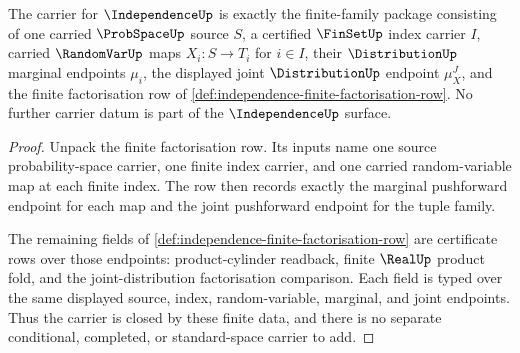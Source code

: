 \begin{theorem}
\label{thm:independence-carrier-obligation}
The carrier for $\IndependenceUp$ is exactly the finite-family package consisting of one carried $\ProbSpaceUp$ source $S$, a certified $\FinSetUp$ index carrier $I$, carried $\RandomVarUp$ maps $X_i:S\to T_i$ for $i\in I$, their $\DistributionUp$ marginal endpoints $\mu_i$, the displayed joint $\DistributionUp$ endpoint $\mu_X^J$, and the finite factorisation row of \autoref{def:independence-finite-factorisation-row}. No further carrier datum is part of the $\IndependenceUp$ surface.
\end{theorem}
\begin{proof}
Unpack the finite factorisation row. Its inputs name one source probability-space carrier, one finite index carrier, and one carried random-variable map at each finite index. The row then records exactly the marginal pushforward endpoint for each map and the joint pushforward endpoint for the tuple family.

The remaining fields of \autoref{def:independence-finite-factorisation-row} are certificate rows over those endpoints: product-cylinder readback, finite $\RealUp$ product fold, and the joint-distribution factorisation comparison. Each field is typed over the same displayed source, index, random-variable, marginal, and joint endpoints. Thus the carrier is closed by these finite data, and there is no separate conditional, completed, or standard-space carrier to add.
\end{proof}

